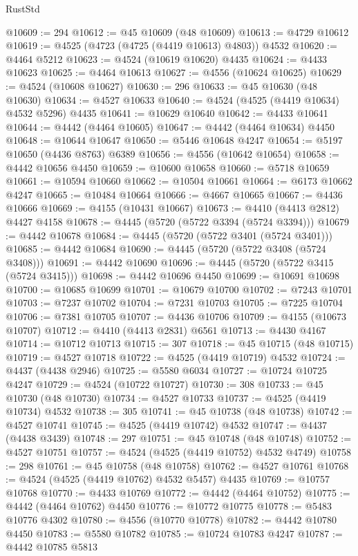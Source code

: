 \begin{lexlean}{RustStd}
\begin{coremodule}
@10609 := 294
@10612 := @45 @10609 (@48 @10609)
@10613 := @4729 @10612
@10619 := @4525 (@4723 (@4725 (@4419 @10613) @4803)) @4532
@10620 := @4464 @5212
@10623 := @4524 (@10619 @10620) @4435
@10624 := @4433 @10623
@10625 := @4464 @10613
@10627 := @4556 (@10624 @10625)
@10629 := @4524 (@10608 @10627)
@10630 := 296
@10633 := @45 @10630 (@48 @10630)
@10634 := @4527 @10633
@10640 := @4524 (@4525 (@4419 @10634) @4532 @5296) @4435
@10641 := @10629 @10640
@10642 := @4433 @10641
@10644 := @4442 (@4464 @10605)
@10647 := @4442 (@4464 @10634) @4450
@10648 := @10644 @10647
@10650 := @5446 @10648 @4247
@10654 := @5197 @10650 (@4436 @8763) @6389
@10656 := @4556 (@10642 @10654)
@10658 := @4442 @10656 @4450
@10659 := @10600 @10658
@10660 := @5718 @10659
@10661 := @10594 @10660
@10662 := @10504 @10661
@10664 := @6173 @10662 @4247
@10665 := @10484 @10664
@10666 := @4667 @10665
@10667 := @4436 @10666
@10669 := @4155 (@10431 @10667)
@10673 := @4410 (@4413 @2812) @4427 @4158
@10678 := @4445 (@5720 (@5722 @3394 (@5724 @3394)))
@10679 := @4442 @10678
@10684 := @4445 (@5720 (@5722 @3401 (@5724 @3401)))
@10685 := @4442 @10684
@10690 := @4445 (@5720 (@5722 @3408 (@5724 @3408)))
@10691 := @4442 @10690
@10696 := @4445 (@5720 (@5722 @3415 (@5724 @3415)))
@10698 := @4442 @10696 @4450
@10699 := @10691 @10698
@10700 := @10685 @10699
@10701 := @10679 @10700
@10702 := @7243 @10701
@10703 := @7237 @10702
@10704 := @7231 @10703
@10705 := @7225 @10704
@10706 := @7381 @10705
@10707 := @4436 @10706
@10709 := @4155 (@10673 @10707)
@10712 := @4410 (@4413 @2831) @6561
@10713 := @4430 @4167
@10714 := @10712 @10713
@10715 := 307
@10718 := @45 @10715 (@48 @10715)
@10719 := @4527 @10718
@10722 := @4525 (@4419 @10719) @4532
@10724 := @4437 (@4438 @2946)
@10725 := @5580 @6034
@10727 := @10724 @10725 @4247
@10729 := @4524 (@10722 @10727)
@10730 := 308
@10733 := @45 @10730 (@48 @10730)
@10734 := @4527 @10733
@10737 := @4525 (@4419 @10734) @4532
@10738 := 305
@10741 := @45 @10738 (@48 @10738)
@10742 := @4527 @10741
@10745 := @4525 (@4419 @10742) @4532
@10747 := @4437 (@4438 @3439)
@10748 := 297
@10751 := @45 @10748 (@48 @10748)
@10752 := @4527 @10751
@10757 := @4524 (@4525 (@4419 @10752) @4532 @4749)
@10758 := 298
@10761 := @45 @10758 (@48 @10758)
@10762 := @4527 @10761
@10768 := @4524 (@4525 (@4419 @10762) @4532 @5457) @4435
@10769 := @10757 @10768
@10770 := @4433 @10769
@10772 := @4442 (@4464 @10752)
@10775 := @4442 (@4464 @10762) @4450
@10776 := @10772 @10775
@10778 := @5483 @10776 @4302
@10780 := @4556 (@10770 @10778)
@10782 := @4442 @10780 @4450
@10783 := @5580 @10782
@10785 := @10724 @10783 @4247
@10787 := @4442 @10785 @5813

\end{coremodule}
\end{lexlean}
